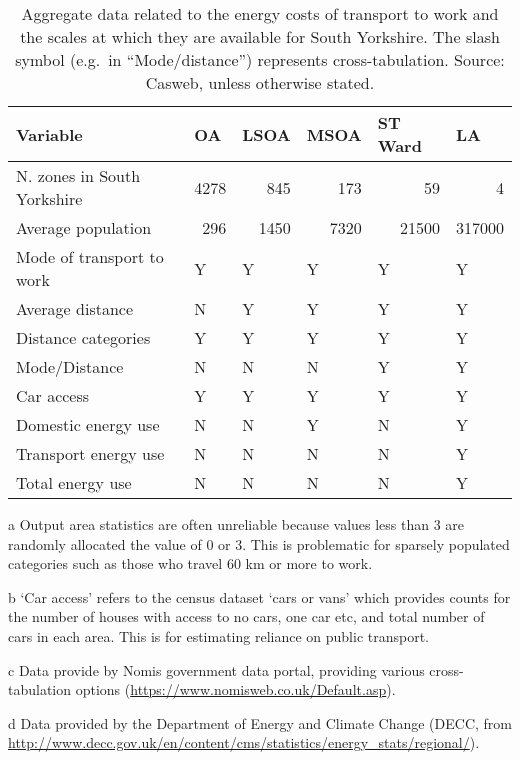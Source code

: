 \begin{table}[htbp]
\begin{threeparttable}
\caption[Aggregate data on energy costs of commuting by
scale]{Aggregate data related to the energy costs of transport to
work and the scales at which they are available for South
Yorkshire. The slash symbol (e.g.~in ``Mode/distance'')
represents cross-tabulation. Source: Casweb, unless otherwise stated.}

\begin{tabular}{|l|l|l|l|l|l|}
\hline
Variable & OA & LSOA & MSOA & ST Ward & LA \\ \hline
N. zones in South Yorkshire & \multicolumn{1}{r|}{4278} &
\multicolumn{1}{r|}{845} &
\multicolumn{1}{r|}{173} & \multicolumn{1}{r|}{59} & \multicolumn{1}{r|}{4} \\

Average population & \multicolumn{1}{r|}{296} & \multicolumn{1}{r|}{1450} &
\multicolumn{1}{r|}{7320} & \multicolumn{1}{r|}{21500} &
\multicolumn{1}{r|}{317000} \\
Mode of transport to work & Y\tnote{a} & Y & Y & Y & Y \\
Average distance & N & Y & Y & Y & Y \\
Distance categories & Y\tnote{a} & Y \tnote{c} & Y\tnote{c} & Y & Y \\
Mode/Distance & N & N & N & Y & Y \\
Car access\tnote{b} & Y & Y & Y & Y & Y \\
Domestic energy use\tnote{d} & N & N & Y & N & Y \\
Transport energy use\tnote{d} & N & N & N & N & Y \\
Total energy use\tnote{d} & N & N & N & N & Y \\ \hline
\end{tabular}
\begin{tablenotes}
\begin{footnotesize}
 \item [a] Output area statistics are often unreliable because values less than
3 are randomly allocated the value of 0 or 3. This is problematic for sparsely
populated categories such as those who travel 60 km or more to work.
\item [b] `Car access' refers to the census dataset `cars or vans' which
provides counts for the number of houses with access to no cars, one car etc,
and total number of cars in each area. This is for estimating reliance on
public transport.
\item [c] Data provide by Nomis government data portal, providing various
cross-tabulation options (\url{https://www.nomisweb.co.uk/Default.asp}).
\item [d] Data provided by the Department of Energy and Climate Change (DECC,
from
\url{http://www.decc.gov.uk/en/content/cms/statistics/energy_stats/regional/}).
\end{footnotesize}
\end{tablenotes}
\label{t:agdata}
\end{threeparttable}
\end{table}

